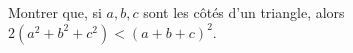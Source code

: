 Montrer que, si $a, b, c$ sont les côtés d'un triangle, alors $2(a^2 + b^2 + c^2) < (a + b + c)^2$.
